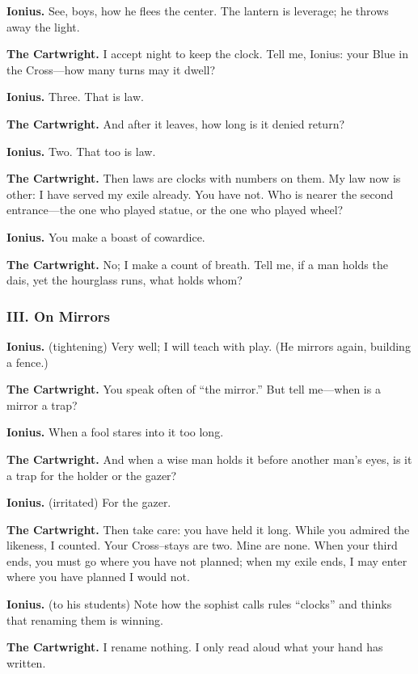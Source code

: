 \documentclass[11pt]{article}
\begin{document}
\noindent\textbf{Ionius.} See, boys, how he flees the center. The lantern is leverage; he throws away the light.

\noindent\textbf{The Cartwright.} I accept night to keep the clock. Tell me, Ionius: your Blue in the Cross—how many turns may it dwell?

\noindent\textbf{Ionius.} Three. That is law.

\noindent\textbf{The Cartwright.} And after it leaves, how long is it denied return?

\noindent\textbf{Ionius.} Two. That too is law.

\noindent\textbf{The Cartwright.} Then laws are clocks with numbers on them. My law now is other: I have served my exile already. You have not. Who is nearer the second entrance—the one who played statue, or the one who played wheel?

\noindent\textbf{Ionius.} You make a boast of cowardice.

\noindent\textbf{The Cartwright.} No; I make a count of breath. Tell me, if a man holds the dais, yet the hourglass runs, what holds whom?

\medskip
\subsubsection*{III. On Mirrors}
\noindent\textbf{Ionius.} (tightening) Very well; I will teach with play. (He mirrors again, building a fence.)

\noindent\textbf{The Cartwright.} You speak often of “the mirror.” But tell me—when is a mirror a trap?

\noindent\textbf{Ionius.} When a fool stares into it too long.

\noindent\textbf{The Cartwright.} And when a wise man holds it before another man’s eyes, is it a trap for the holder or the gazer?

\noindent\textbf{Ionius.} (irritated) For the gazer.

\noindent\textbf{The Cartwright.} Then take care: you have held it long. While you admired the likeness, I counted. Your Cross–stays are two. Mine are none. When your third ends, you must go where you have not planned; when my exile ends, I may enter where you have planned I would not.

\noindent\textbf{Ionius.} (to his students) Note how the sophist calls rules “clocks” and thinks that renaming them is winning.

\noindent\textbf{The Cartwright.} I rename nothing. I only read aloud what your hand has written.
\end{document}
